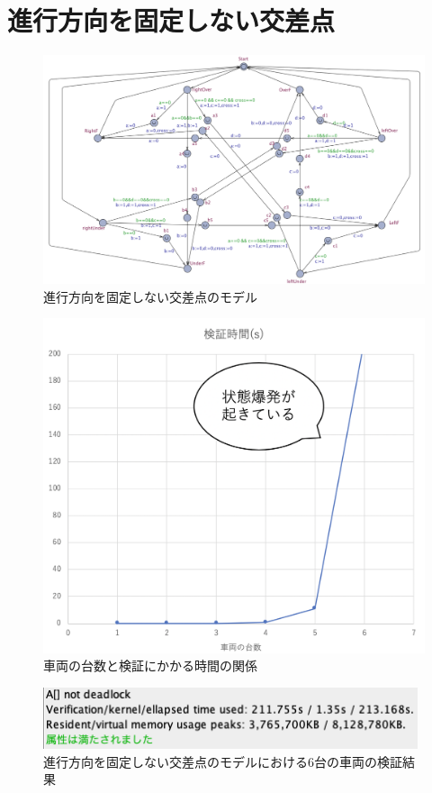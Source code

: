 \documentclass{tpu-sotu}
\begin{document}
	\section{進行方向を固定しない交差点}
	\begin{figure}[htbp]
	\centering
	\includegraphics[width=160mm]{IntersectionBig.png}
	\caption{進行方向を固定しない交差点のモデル}
	\label{IB}
	\end{figure}
	\begin{figure}[htbp]
	\centering
	\includegraphics[width=120mm]{IntersectionVerificationTime.png}
	\caption{車両の台数と検証にかかる時間の関係}
	\label{IVT}
	\end{figure}
	\begin{figure}[htbp]
	\centering
	\includegraphics[width=110mm]{InterBigCar6.png}
	\caption{進行方向を固定しない交差点のモデルにおける6台の車両の検証結果}
	\label{IBC6}
	\end{figure}
	\newpage
\end{document}
